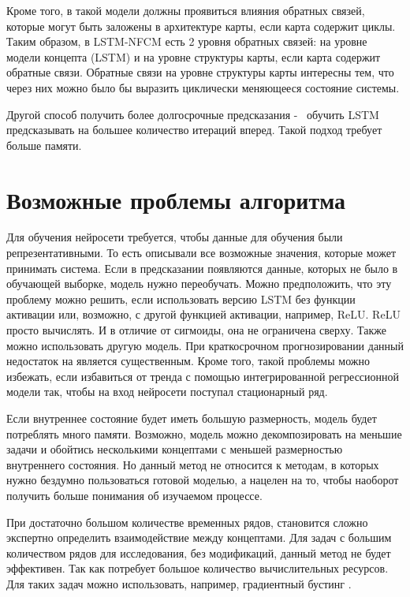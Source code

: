 Кроме того, в такой модели должны проявиться влияния обратных связей, которые могут
быть заложены в архитектуре карты, если карта содержит циклы.
Таким образом, в LSTM-NFCM есть 2 уровня обратных связей:
на уровне модели концепта (LSTM) и на уровне структуры карты,
если карта содержит обратные связи.
Обратные связи на уровне структуры карты интересны тем, что
через них можно было бы выразить циклически меняющееся состояние системы.

Другой способ получить более долгосрочные предсказания -~ обучить LSTM
предсказывать на большее количество итераций вперед. Такой подход
требует больше памяти.

\section{Возможные проблемы алгоритма}

Для обучения  нейросети требуется, чтобы
данные для обучения были репрезентативными. То есть
описывали все возможные значения, которые может принимать система.
Если в предсказании появляются данные, которых не было в обучающей выборке,
модель нужно переобучать. Можно предположить, что эту проблему можно решить,
если использовать версию LSTM без функции активации или, возможно, с другой
функцией активации, например, ReLU. ReLU просто вычислять. И в отличие от
сигмоиды, она не ограничена сверху. Также можно использовать другую модель.
При краткосрочном прогнозировании данный недостаток на является существенным.
Кроме того, такой проблемы можно избежать, если избавиться от тренда с
помощью интегрированной регрессионной модели так, чтобы на вход нейросети
поступал стационарный ряд.

Если внутреннее состояние будет иметь большую размерность,
модель будет потреблять много памяти. Возможно, модель можно
декомпозировать на меньшие задачи и обойтись несколькими концептами
с меньшей размерностью внутреннего состояния.
Но данный метод не относится к методам, в которых нужно бездумно
пользоваться готовой моделью, а нацелен на то, чтобы наоборот
получить больше понимания об изучаемом процессе.

При достаточно большом количестве временных рядов,
становится сложно экспертно определить взаимодействие между концептами.
Для задач с большим количеством рядов для исследования, без
модификаций, данный метод не будет эффективен. Так как потребует
большое количество вычислительных ресурсов.
Для таких задач можно использовать, например, градиентный бустинг \cite{friedman2002stochastic}.

